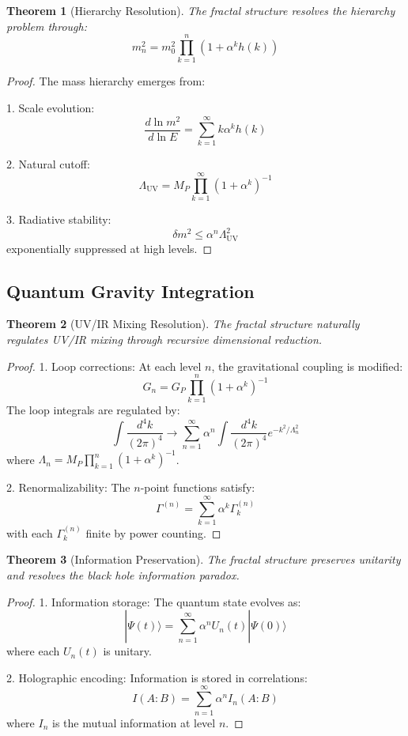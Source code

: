 \documentclass[12pt]{article}
\newtheorem{theorem}{Theorem}[section]
\begin{document}
\begin{theorem}[Hierarchy Resolution]
The fractal structure resolves the hierarchy problem through:
\[
m_n^2 = m_0^2 \prod_{k=1}^n (1 + \alpha^k h(k))
\]
\end{theorem}

\begin{proof}
The mass hierarchy emerges from:

1. Scale evolution:
   \[
   \frac{d\ln m^2}{d\ln E} = \sum_{k=1}^{\infty} k\alpha^k h(k)
   \]
   
2. Natural cutoff:
   \[
   \Lambda_{\text{UV}} = M_P \prod_{k=1}^{\infty} (1 + \alpha^k)^{-1}
   \]
   
3. Radiative stability:
   \[
   \delta m^2 \leq \alpha^n \Lambda_{\text{UV}}^2
   \]
   exponentially suppressed at high levels.
\end{proof}

\subsection{Quantum Gravity Integration}

\begin{theorem}[UV/IR Mixing Resolution]
The fractal structure naturally regulates UV/IR mixing through recursive dimensional reduction.
\end{theorem}

\begin{proof}
1. Loop corrections:
   At each level $n$, the gravitational coupling is modified:
   \[
   G_n = G_P \prod_{k=1}^n (1 + \alpha^k)^{-1}
   \]
   The loop integrals are regulated by:
   \[
   \int \frac{d^4k}{(2\pi)^4} \to \sum_{n=1}^{\infty} \alpha^n \int \frac{d^4k}{(2\pi)^4} e^{-k^2/\Lambda_n^2}
   \]
   where $\Lambda_n = M_P \prod_{k=1}^n (1 + \alpha^k)^{-1}$.

2. Renormalizability:
   The $n$-point functions satisfy:
   \[
   \Gamma^{(n)} = \sum_{k=1}^{\infty} \alpha^k \Gamma_k^{(n)}
   \]
   with each $\Gamma_k^{(n)}$ finite by power counting.
\end{proof}

\begin{theorem}[Information Preservation]
The fractal structure preserves unitarity and resolves the black hole information paradox.
\end{theorem}

\begin{proof}
1. Information storage:
   The quantum state evolves as:
   \[
   |\Psi(t)\rangle = \sum_{n=1}^{\infty} \alpha^n U_n(t)|\Psi(0)\rangle
   \]
   where each $U_n(t)$ is unitary.

2. Holographic encoding:
   Information is stored in correlations:
   \[
   I(A:B) = \sum_{n=1}^{\infty} \alpha^n I_n(A:B)
   \]
   where $I_n$ is the mutual information at level $n$.
\end{proof}
\end{document}
